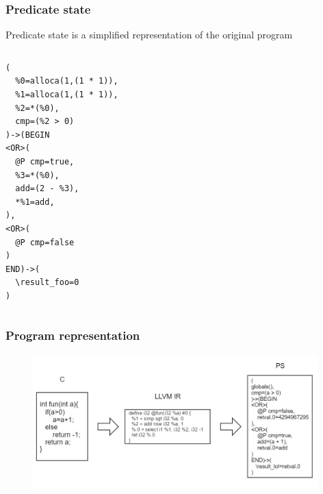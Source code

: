 

\begin{frame}[fragile]
	\frametitle{Predicate state}
	
	\begin{block}{}
	Predicate state is a simplified representation of the original program
	\end{block}
	
	\begin{columns}
	\begin{lstlisting}[language=PS, frame=single]
(
  %0=alloca(1,(1 * 1)),
  %1=alloca(1,(1 * 1)),
  %2=*(%0),
  cmp=(%2 > 0)
)->(BEGIN
<OR>(
  @P cmp=true,
  %3=*(%0),
  add=(2 - %3),
  *%1=add,
),
<OR>(
  @P cmp=false
)
END)->(
  \result_foo=0
)
	\end{lstlisting}
	
	\end{columns}
	
\end{frame}


\begin{frame}
	\frametitle{Program representation}
	\begin{figure}
	\includegraphics[width=110mm, keepaspectratio]{image/PSdef}
	\end{figure}
\end{frame}


